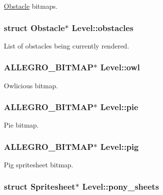 \hyperlink{structObstacle}{\-Obstacle} bitmaps. \hypertarget{structLevel_a4b4ac826580c681b588dae8ae0dde418}{
\subsubsection[{obstacles}]{\setlength{\rightskip}{0pt plus 5cm}struct {\bf \-Obstacle}$\ast$ {\bf \-Level\-::obstacles}}}\label{structLevel_a4b4ac826580c681b588dae8ae0dde418}
\-List of obstacles being currently rendered. \hypertarget{structLevel_af504e3f628040bc2a2913a50253e856d}{
\subsubsection[{owl}]{\setlength{\rightskip}{0pt plus 5cm}\-A\-L\-L\-E\-G\-R\-O\-\_\-\-B\-I\-T\-M\-A\-P$\ast$ {\bf \-Level\-::owl}}}\label{structLevel_af504e3f628040bc2a2913a50253e856d}
\-Owlicious bitmap. \hypertarget{structLevel_a8910f05e860fca85c96ae45633cc244d}{
\subsubsection[{pie}]{\setlength{\rightskip}{0pt plus 5cm}\-A\-L\-L\-E\-G\-R\-O\-\_\-\-B\-I\-T\-M\-A\-P$\ast$ {\bf \-Level\-::pie}}}\label{structLevel_a8910f05e860fca85c96ae45633cc244d}
\-Pie bitmap. \hypertarget{structLevel_aacde4816ff59c4d9ab6f403758630b8f}{
\subsubsection[{pig}]{\setlength{\rightskip}{0pt plus 5cm}\-A\-L\-L\-E\-G\-R\-O\-\_\-\-B\-I\-T\-M\-A\-P$\ast$ {\bf \-Level\-::pig}}}\label{structLevel_aacde4816ff59c4d9ab6f403758630b8f}
\-Pig spritesheet bitmap. \hypertarget{structLevel_a591b830752cc796a306e96166f736e3b}{
\subsubsection[{pony\-\_\-sheets}]{\setlength{\rightskip}{0pt plus 5cm}struct {\bf \-Spritesheet}$\ast$ {\bf \-Level\-::pony\-\_\-sheets}}}\label{structLevel_a591b830752cc796a306e96166f736e3b}

